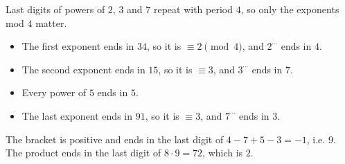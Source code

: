 Last digits of powers of $2$, $3$ and $7$ repeat with period $4$, so only the exponents mod $4$ matter.
\begin{itemize}
\item The first exponent ends in $34$, so it is $\equiv2\pmod4$, and $2^{\cdots}$ ends in $4$.
\item The second exponent ends in $15$, so it is $\equiv3$, and $3^{\cdots}$ ends in $7$.
\item Every power of $5$ ends in $5$.
\item The last exponent ends in $91$, so it is $\equiv3$, and $7^{\cdots}$ ends in $3$.
\end{itemize}
The bracket is positive and ends in the last digit of $4-7+5-3=-1$, i.e. $9$. The product ends in the last digit of $8\cdot9=72$, which is $\boxed{2}$.
